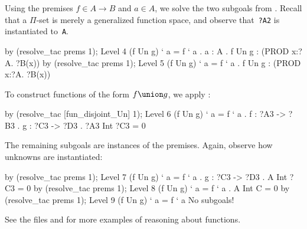 Using the premises $f\in A\to B$ and $a\in A$, we solve the two subgoals
from .  Recall that a $\Pi$-set is merely a generalized
function space, and observe that~{\tt?A2} is instantiated to~{\tt A}.
\begin{ttbox}
by (resolve_tac prems 1);
{\out Level 4}
{\out (f Un g) ` a = f ` a}
{. a : A}
{. f Un g : (PROD x:?A. ?B(x))}
by (resolve_tac prems 1);
{\out Level 5}
{\out (f Un g) ` a = f ` a}
{. f Un g : (PROD x:?A. ?B(x))}
\end{ttbox}
To construct functions of the form $f\union g$, we apply
:
\begin{ttbox}
by (resolve_tac [fun_disjoint_Un] 1);
{\out Level 6}
{\out (f Un g) ` a = f ` a}
{. f : ?A3 -> ?B3}
{. g : ?C3 -> ?D3}
{. ?A3 Int ?C3 = 0}
\end{ttbox}
The remaining subgoals are instances of the premises.  Again, observe how
unknowns are instantiated:
\begin{ttbox}
by (resolve_tac prems 1);
{\out Level 7}
{\out (f Un g) ` a = f ` a}
{. g : ?C3 -> ?D3}
{. A Int ?C3 = 0}
by (resolve_tac prems 1);
{\out Level 8}
{\out (f Un g) ` a = f ` a}
{. A Int C = 0}
by (resolve_tac prems 1);
{\out Level 9}
{\out (f Un g) ` a = f ` a}
{\out No subgoals!}
\end{ttbox}
See the files  and  for more
examples of reasoning about functions.
